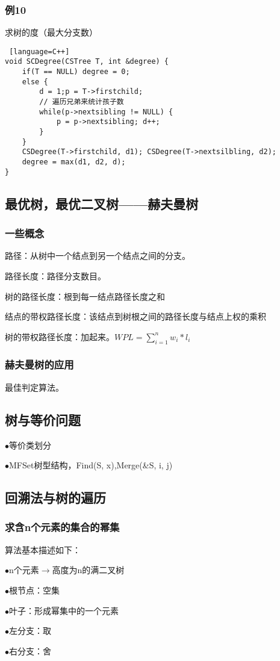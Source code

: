 \documentclass[UTF8]{article}
\begin{document}
\subsubsection{例10}
求树的度（最大分支数）
\begin{lstlisting} [language=C++]
void SCDegree(CSTree T, int &degree) {
	if(T == NULL) degree = 0;
	else {
		d = 1;p = T->firstchild;
		// 遍历兄弟来统计孩子数
		while(p->nextsibling != NULL) {
			p = p->nextsibling; d++;
		}
	}
	CSDegree(T->firstchild, d1); CSDegree(T->nextsilbling, d2);
	degree = max(d1, d2, d);
}
\end{lstlisting}

\subsection{最优树，最优二叉树——赫夫曼树}
\subsubsection{一些概念}
路径：从树中一个结点到另一个结点之间的分支。\par
路径长度：路径分支数目。\par
树的路径长度：根到每一结点路径长度之和\par
结点的带权路径长度：该结点到树根之间的路径长度与结点上权的乘积\par
树的带权路径长度：加起来。$WPL=\sum_{i=1}^{n}w_{i}*l_{i}$
\subsubsection{赫夫曼树的应用}
最佳判定算法。

\subsection{树与等价问题}
$\bullet$等价类划分\par
$\bullet$MFSet树型结构，Find(S, x),Merge(\&S, i, j)\par

\subsection{回溯法与树的遍历}
\subsubsection{求含n个元素的集合的幂集}
算法基本描述如下：\par
$\bullet$n个元素$\rightarrow$高度为n的满二叉树\par
$\bullet$根节点：空集\par
$\bullet$叶子：形成幂集中的一个元素\par
$\bullet$左分支：取\par
$\bullet$右分支：舍\par
\end{document}
